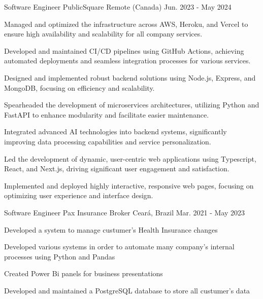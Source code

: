 \begin{cventries}
\cventry
{Software Engineer} %
{PublicSquare} %
{Remote (Canada)} %
{Jun. 2023 - May 2024} %
{
  \begin{cvitems} %
    \item {Managed and optimized the infrastructure across AWS, Heroku, and Vercel to ensure high availability and scalability for all company services.}
    \item{Developed and maintained CI/CD pipelines using GitHub Actions, achieving automated deployments and seamless integration processes for various services.}
    \item{Designed and implemented robust backend solutions using Node.js, Express, and MongoDB, focusing on efficiency and scalability.}
    \item{Spearheaded the development of microservices architectures, utilizing Python and FastAPI to enhance modularity and facilitate easier maintenance.}
    \item{Integrated advanced AI technologies into backend systems, significantly improving data processing capabilities and service personalization.}
    \item{Led the development of dynamic, user-centric web applications using Typescript, React, and Next.js, driving significant user engagement and satisfaction.}
    \item{Implemented and deployed highly interactive, responsive web pages, focusing on optimizing user experience and interface design.}
  \end{cvitems}
}



  \cventry
    {Software Engineer} %
    {Pax Insurance Broker} %
    {Ceará, Brazil} %
    {Mar. 2021 - May 2023} %
    {
      \begin{cvitems} %
        \item {Developed a system to manage custumer's Health Insurance changes}
        \item {Developed various systems in order to automate many company's internal processes using Python and Pandas}
        \item {Created Power Bi panels for business presentations}
        \item {Developed and maintained a PostgreSQL database to store
        all custumer's data}
      \end{cvitems}
    }


\end{cventries}
